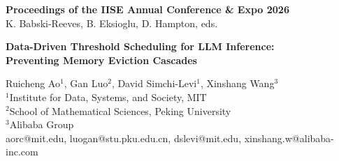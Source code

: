 \documentclass[10pt]{article}
\begin{document}
\begin{center}
{\fontsize{12}{14}\selectfont\bfseries Proceedings of the IISE Annual Conference \& Expo 2026}\\
{\fontsize{10}{12}\selectfont K. Babski-Reeves, B. Eksioglu, D. Hampton, eds.}
\end{center}

\vspace{0.5cm}

\begin{center}
{\fontsize{16}{19}\selectfont\bfseries Data-Driven Threshold Scheduling for LLM Inference:\\
Preventing Memory Eviction Cascades}
\end{center}

\vspace{0.2cm}

\begin{center}
{\fontsize{10}{11}\selectfont
Ruicheng Ao$^1$, Gan Luo$^2$, David Simchi-Levi$^1$, Xinshang Wang$^3$\\
\vspace{0.05cm}
$^1$Institute for Data, Systems, and Society, MIT\\
$^2$School of Mathematical Sciences, Peking University\\
$^3$Alibaba Group\\
aorc@mit.edu, luogan@stu.pku.edu.cn, dslevi@mit.edu, xinshang.w@alibaba-inc.com
}
\end{center}

\vspace{0.15cm}


\end{document}

